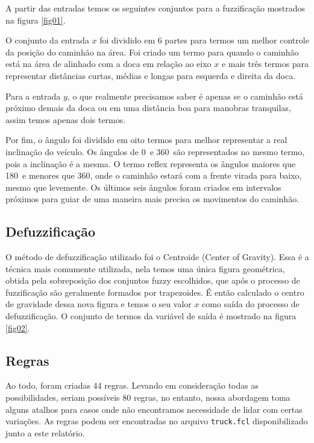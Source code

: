 \documentclass{article}
\begin{document}
A partir das entradas temos os seguintes conjuntos para a fuzzificação mostrados na figura \ref{fig01}.

O conjunto da entrada $x$ foi dividido em 6 partes para termos um melhor controle da posição do caminhão na área. Foi criado um termo para quando o caminhão está na área de alinhado com a doca em relação ao eixo $x$ e mais três termos para representar distâncias curtas, médias e longas para esquerda e direita da doca.

Para a entrada $y$, o que realmente precisamos saber é apenas se o caminhão está próximo demais da doca ou em uma distância boa para manobras tranquilas, assim temos apenas dois termos.

Por fim, o ângulo foi dividido em oito termos para melhor representar a real inclinação do veículo. Os ângulos de 0\degree\ e 360\degree\ são representados no mesmo termo, pois a inclinação é a mesma. O termo reflex representa os ângulos maiores que 180\degree\ e menores que 360\degree, onde o caminhão estará com a frente virada para baixo, mesmo que levemente. Os últimos seis ângulos foram criados em intervalos próximos para guiar de uma maneira mais precisa os movimentos do caminhão.


\subsection{Defuzzificação}

O método de defuzzificação utilizado foi o Centroide (Center of Gravity). Essa é a técnica mais comumente utilizada, nela temos uma única figura geométrica, obtida pela sobreposição dos conjuntos fuzzy escolhidos, que após o processo de fuzzificação são geralmente formados por trapezoides. É então calculado o centro de gravidade dessa nova figura e temos o seu valor $x$ como saída do processo de defuzzificação. O conjunto de termos da variável de saída é mostrado na figura \ref{fig02}.


\subsection{Regras}

Ao todo, foram criadas 44 regras. Levando em consideração todas as possibilidades, seriam possíveis 80 regras, no entanto, nossa abordagem toma alguns atalhos para casos onde não encontramos necessidade de lidar com certas variações. As regras podem ser encontradas no arquivo \texttt{truck.fcl} disponibilizado junto a este relatório.
\end{document}
